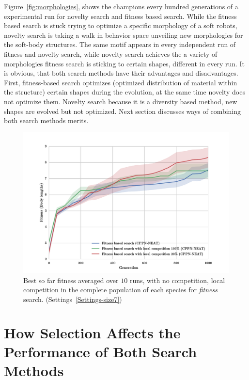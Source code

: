 Figure~\ref{fig:morphologies}, shows the champions every hundred generations of a experimental run for novelty search and fitness based search. While the fitness based search is stuck trying to optimize a specific morphology of a soft robots, novelty search is taking a walk in behavior space unveiling new morphologies for the soft-body structures. The same motif appears in every independent run of fitness and novelty search, while novelty search achieves the a variety of morphologies fitness search is sticking to certain shapes, different in every run. It is obvious, that both search methods have their advantages and disadvantages. First, fitness-based search optimizes (optimized distribution of material within the structure) certain shapes during the evolution, at the same time novelty does not optimize them. Novelty search because it is a diversity based method, new shapes are evolved but not optimized. Next section discusses ways of combining both search methods merits.

\begin{figure}[b!]
\centering
\includegraphics[width=1.0\textwidth]{../Figures/Results/fitComp100_20percent.pdf}
\caption{Best so far fitness averaged over $10$ runs, with no competition, local competition in the complete population of each species for \emph{fitness} search. (Settings~\ref{Settings-size7})}
\label{fig:fitComp100_20percent}
\end{figure}

\section{How Selection Affects the Performance of Both Search Methods}

